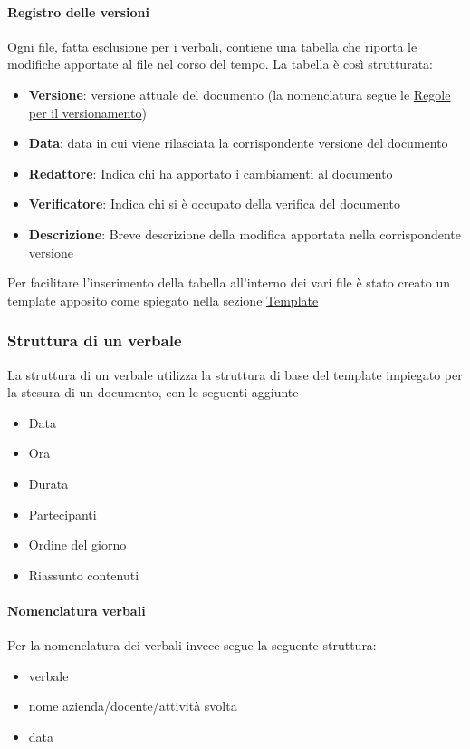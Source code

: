 \documentclass[12pt]{article}
\begin{document}
\paragraph{Registro delle versioni}
Ogni file, fatta esclusione per i verbali, contiene una tabella che riporta le modifiche apportate al file nel corso del tempo.
La tabella è così strutturata:
\begin{itemize}
    \item \textbf{Versione}: versione attuale del documento (la nomenclatura segue le \hyperref[ver]{Regole per il versionamento})
    \item \textbf{Data}: data in cui viene rilasciata la corrispondente versione del documento
    \item \textbf{Redattore}: Indica chi ha apportato i cambiamenti al documento
    \item \textbf{Verificatore}: Indica chi si è occupato della verifica del documento
    \item \textbf{Descrizione}: Breve descrizione della modifica apportata nella corrispondente versione
\end{itemize}
Per facilitare l'inserimento della tabella all'interno dei vari file è stato creato un template apposito come spiegato nella sezione \hyperref[ver]{Template}

\subsubsection{Struttura di un verbale}
La struttura di un verbale utilizza la struttura di base del template impiegato per la stesura di un documento, con le seguenti aggiunte
\begin{itemize}
    \item Data
    \item Ora
    \item Durata
    \item Partecipanti
    \item Ordine del giorno
    \item Riassunto contenuti
\end{itemize}
\paragraph{Nomenclatura verbali}
Per la nomenclatura dei verbali invece segue la seguente struttura:
\begin{itemize}
    \item verbale
    \item nome azienda/docente/attività svolta
    \item data
\end{itemize}
\end{document}
